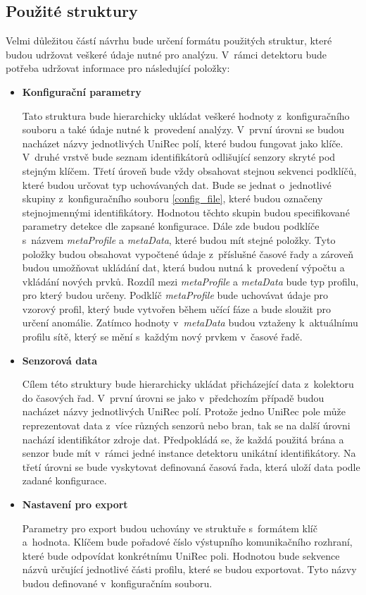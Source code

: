  \subsection{Použité struktury}
 Velmi důležitou částí návrhu bude určení formátu použitých struktur, které budou udržovat veškeré 
 údaje nutné pro analýzu. V~rámci detektoru bude potřeba udržovat informace pro následující
 položky:
  \begin{itemize}
   \item \textbf{Konfigurační parametry} \label{configParam}
   
   Tato struktura bude hierarchicky ukládat veškeré hodnoty z~konfiguračního souboru
   a také údaje nutné k~provedení analýzy. V~první úrovni se budou nacházet názvy jednotlivých 
   UniRec polí, které budou fungovat jako klíče. V~druhé vrstvě bude seznam identifikátorů 
   odlišující senzory skryté pod stejným klíčem.
   Třetí úroveň bude vždy obsahovat stejnou 
   sekvenci podklíčů, které budou určovat typ uchovávaných dat. Bude se jednat o~jednotlivé 
   skupiny z~konfiguračního souboru \ref{config_file}, které budou označeny stejnojmennými
   identifikátory. Hodnotou těchto skupin budou specifikované parametry detekce dle zapsané
   konfigurace. Dále zde budou podklíče s~názvem \textit{metaProfile} a \textit{metaData},
   které budou mít
   stejné položky. Tyto položky budou obsahovat vypočtené údaje z~příslušné časové řady
   a zároveň budou umožňovat ukládání dat, která budou nutná k~provedení výpočtu 
   a vkládání nových prvků. Rozdíl mezi \textit{metaProfile} a \textit{metaData} bude typ profilu,
   pro který budou určeny. Podklíč \textit{metaProfile} bude uchovávat údaje pro vzorový profil,
   který bude vytvořen během učící fáze a bude sloužit pro určení anomálie. Zatímco 
   hodnoty v~\textit{metaData} budou vztaženy k~aktuálnímu profilu sítě, který se mění s~každým
   nový prvkem v~časové řadě.

   \item \textbf{Senzorová data}
   
   Cílem této struktury bude hierarchicky ukládat přicházející data z~kolektoru do časových řad. 
   V~první úrovni se jako v~předchozím případě budou nacházet názvy jednotlivých UniRec polí. 
   Protože jedno UniRec pole může reprezentovat data z~více různých senzorů nebo bran, tak se na 
   další úrovni nachází identifikátor zdroje dat. Předpokládá se, že každá použitá brána a senzor 
   bude mít v~rámci jedné instance detektoru unikátní identifikátory. Na třetí úrovni se bude vyskytovat 
   definovaná časová řada, která uloží data podle zadané konfigurace.
   
   \item \textbf{Nastavení pro export} 
   
   Parametry pro export budou uchovány ve struktuře s~formátem klíč a~hodnota. Klíčem bude 
   pořadové číslo výstupního komunikačního rozhraní, které bude odpovídat konkrétnímu UniRec poli. Hodnotou 
   bude sekvence názvů určující jednotlivé části profilu, které se budou exportovat. Tyto názvy
   budou definované v~konfiguračním souboru. 
   
  \end{itemize}

